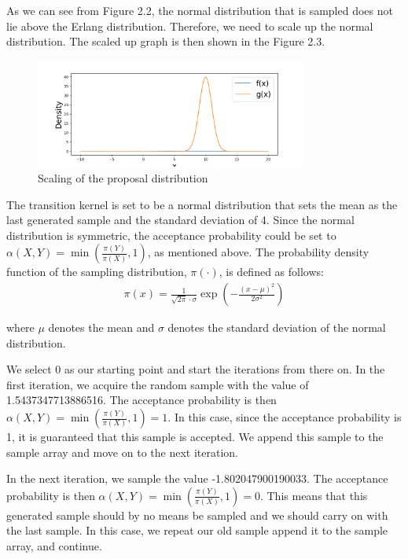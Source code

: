 As we can see from Figure 2.2, the normal distribution that is sampled does not lie above the Erlang distribution. Therefore, we need to scale up the normal distribution. The scaled up graph is then shown in the Figure 2.3.

\begin{figure}[H]
    \centering
    \includegraphics[width=0.8\textwidth]{figures/mcmc_example/second_step.png}
    \captionsetup{width=.8\textwidth}
    \caption{Scaling of the proposal distribution}
    \label{fig:enter-label}
\end{figure}



The transition kernel is set to be a normal distribution that sets the mean as the last generated sample and the standard deviation of 4. Since the normal distribution is symmetric, the acceptance probability could be set to $\alpha(X, Y) = \min (\frac{\pi(Y)}{\pi(X)}, 1)$, as mentioned above. The probability density function of the sampling distribution, $\pi(\cdot)$, is defined as follows:
\begin{align}
\pi(x) = \frac{1}{\sqrt{2\pi} \cdot \sigma}\exp(-\frac{(x-\mu)^2}{2\sigma^2})
\end{align}

where $\mu$ denotes the mean and $\sigma$ denotes the standard deviation of the normal distribution.\linebreak\cite{densityFunction}

We select 0 as our starting point and start the iterations from there on. In the first iteration, we acquire the random sample with the value of 1.5437347713886516. The acceptance probability is then $\alpha(X, Y) = \min (\frac{\pi(Y)}{\pi(X)}, 1) = 1$. In this case, since the acceptance probability is 1, it is guaranteed that this sample is accepted. We append this sample to the sample array and move on to the next iteration.

In the next iteration, we sample the value -1.802047900190033. The acceptance probability is then $\alpha(X, Y) = \min (\frac{\pi(Y)}{\pi(X)}, 1) = 0$. This means that this generated sample should by no means be sampled and we should carry on with the last sample. In this case, we repeat our old sample append it to the sample array, and continue.

